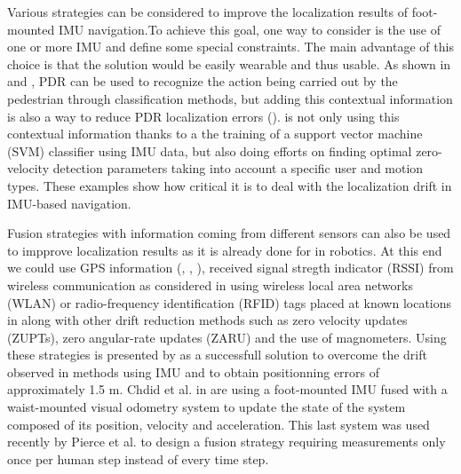 Various strategies can be considered to improve the localization results of foot-mounted IMU navigation.To achieve this goal, one way to consider is the use of one or more IMU and define some special constraints.
The main advantage of this choice is that the solution would be easily wearable and thus usable.
As shown in \cite{kourogi2010method} and \cite{panahandeh2012chest}, PDR can be used to recognize the action being carried out by the pedestrian through classification methods, but adding this contextual 
information is also a way to reduce PDR localization errors (\cite{kourogi2010method}). \cite{wagstaff2017improving} is not only using this contextual information thanks to a the training of a support vector machine (SVM) classifier using IMU data, but also
doing efforts on finding optimal zero-velocity detection parameters taking into account a specific user and motion types. These examples show how critical it is to deal with the localization drift in IMU-based navigation. 

Fusion strategies with information coming from different sensors can also be used to impprove localization results as it is already done
for in robotics. At this end we could use GPS information (\cite{sukkarieh1999high}, \cite{hide2012investigating}, \cite{gao2014data}), received signal stregth indicator (RSSI) from wireless communication as considered
in \cite{malyavej2013indoor} using wireless local area networks (WLAN) or radio-frequency identification (RFID) tags placed at known locations in \cite{ruiz2012accurate}
along with other drift reduction methods such as zero velocity updates (ZUPTs), zero angular-rate updates (ZARU) and the use of magnometers.
Using these strategies is presented by \cite{ruiz2012accurate} as a successfull solution to overcome the drift observed in methods using IMU and to obtain positionning errors of approximately 1.5 m.
Chdid et al. in \cite{chdid2011inertial} are using a foot-mounted IMU fused with a waist-mounted visual odometry system to update the state of the system composed of its position, velocity and acceleration.
This last system was used recently by Pierce et al. \cite{pierce2016incorporation} to design a fusion strategy requiring measurements only once per human step instead of every time step.




